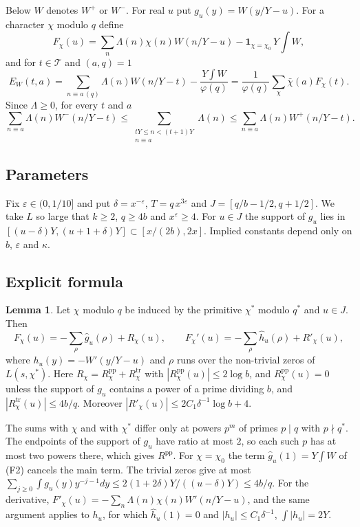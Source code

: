 \documentclass[11pt]{amsart}
\makeatletter
\theoremstyle{definition}
\newtheorem{lemma}[theorem]{Lemma}
\numberwithin{equation}{section}
\renewenvironment{proof}[1][\proofname]{\par\pushQED{\qed}\normalfont\topsep6\p@\@plus6\p@\relax\trivlist\item[\hskip\labelsep\upshape#1.]\ignorespaces}{\popQED\endtrivlist\@endpefalse}
\newcommand{\cT}{\mathcal{T}}
\makeatother
\begin{document}
Below $W$ denotes $W^+$ or $W^-$. For real $u$ put $g_u(y)=W(y/Y-u)$. For a character $\chi$ modulo $q$ define
\[
F_\chi(u)=\sum_n\Lambda(n)\chi(n)W(n/Y-u)-\mathbf 1_{\chi=\chi_0}\,Y\!\int W,
\]
and for $t\in\cT$ and $(a,q)=1$
\[
E_W(t,a)=\sum_{n\equiv a\,(q)}\Lambda(n)W(n/Y-t)-\frac{Y\int W}{\varphi(q)}=\frac1{\varphi(q)}\sum_\chi\bar\chi(a)F_\chi(t).
\tag{3.1}
\]
Since $\Lambda\ge0$, for every $t$ and $a$
\[
\sum_{n\equiv a}\Lambda(n)W^-(n/Y-t)\le\sum_{\substack{tY\le n<(t+1)Y\\ n\equiv a}}\Lambda(n)\le\sum_{n\equiv a}\Lambda(n)W^+(n/Y-t).
\tag{3.2}
\]

\subsection{Parameters}
Fix $\varepsilon\in(0,1/10]$ and put $\delta=x^{-\varepsilon}$, $T=q\,x^{3\varepsilon}$ and $J=[q/b-1/2,q+1/2]$. We take $L$ so large that $k\ge2$, $q\ge4b$ and $x^\varepsilon\ge4$. For $u\in J$ the support of $g_u$ lies in $[(u-\delta)Y,(u+1+\delta)Y]\subset[x/(2b),2x]$. Implied constants depend only on $b$, $\varepsilon$ and $\kappa$.

\subsection{Explicit formula}

\begin{lemma}\label{lem:explicit}
Let $\chi$ modulo $q$ be induced by the primitive $\chi^*$ modulo $q^*$ and $u\in J$. Then
\[
F_\chi(u)=-\sum_\rho\hat g_u(\rho)+R_\chi(u),\qquad F_\chi'(u)=-\sum_\rho\hat h_u(\rho)+R'_\chi(u),
\]
where $h_u(y)=-W'(y/Y-u)$ and $\rho$ runs over the non-trivial zeros of $L(s,\chi^*)$. Here $R_\chi=R^{\mathrm{pp}}_\chi+R^{\mathrm{tr}}_\chi$ with $|R^{\mathrm{pp}}_\chi(u)|\le2\log b$, and $R^{\mathrm{pp}}_\chi(u)=0$ unless the support of $g_u$ contains a power of a prime dividing $b$, and $|R^{\mathrm{tr}}_\chi(u)|\le4b/q$. Moreover $|R'_\chi(u)|\le2C_1\delta^{-1}\log b+4$.
\end{lemma}

\begin{proof}
The sums with $\chi$ and with $\chi^*$ differ only at powers $p^m$ of primes $p\mid q$ with $p\nmid q^*$. The endpoints of the support of $g_u$ have ratio at most $2$, so each such $p$ has at most two powers there, which gives $R^{\mathrm{pp}}$. For $\chi=\chi_0$ the term $\hat g_u(1)=Y\int W$ of (F2) cancels the main term. The trivial zeros give at most $\sum_{j\ge0}\int g_u(y)y^{-j-1}dy\le2(1+2\delta)Y/((u-\delta)Y)\le4b/q$. For the derivative, $F'_\chi(u)=-\sum_n\Lambda(n)\chi(n)W'(n/Y-u)$, and the same argument applies to $h_u$, for which $\hat h_u(1)=0$ and $|h_u|\le C_1\delta^{-1}$, $\int|h_u|=2Y$.
\end{proof}
\end{document}
